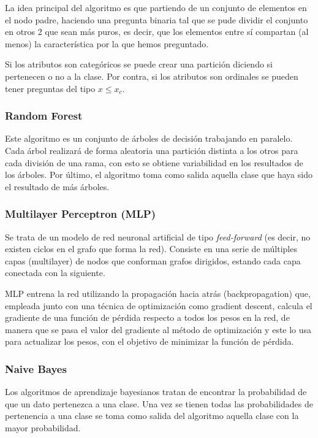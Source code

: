 La idea principal del algoritmo es que partiendo de un conjunto de elementos en el nodo padre, haciendo una pregunta binaria tal que se pude dividir el conjunto en otros 2 que sean más puros, es decir, que los elementos entre sí compartan (al menos) la característica por la que hemos preguntado.

Si los atributos son categóricos se puede crear una partición diciendo si pertenecen o no a la clase. Por contra, si los atributos son ordinales se pueden tener preguntas del tipo $x \leq x_c$.

\subsubsection{Random Forest}

Este algoritmo es un conjunto de árboles de decisión trabajando en paralelo. Cada árbol realizará de forma aleatoria una partición distinta a los otros para cada división de una rama, con esto se obtiene variabilidad en los resultados de los árboles. Por último, el algoritmo toma como salida aquella clase que haya sido el resultado de más árboles.  \cite{hatwell2020chirps} \cite{breiman2001random}

\subsubsection{Multilayer Perceptron (MLP)}

Se trata de un modelo de red neuronal artificial de tipo \textit{feed-forward} (es decir, no existen ciclos en el grafo que forma la red). Consiste en una serie de múltiples capas (multilayer) de nodos que conforman grafos dirigidos, estando cada capa conectada con la siguiente. 

MLP entrena la red utilizando la propagación hacia atrás (backpropagation) que, empleada junto con una técnica de optimización como gradient descent, calcula el gradiente de una función de pérdida respecto a todos los pesos en la red, de manera que se pasa el valor del gradiente al método de optimización y este lo usa para actualizar los pesos, con el objetivo de minimizar la función de pérdida.

\subsubsection{Naive Bayes}

Los algoritmos de aprendizaje bayesianos tratan de encontrar la probabilidad de que un dato pertenezca a una clase. Una vez se tienen todas las probabilidades de pertenencia a una clase se toma como salida del algoritmo aquella clase con la mayor probabilidad.

